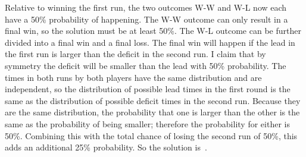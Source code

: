 \documentclass{article}
\begin{document}
Relative to winning the first run, the two outcomes W-W and W-L now each have a 50\% probability of happening.
The W-W outcome can only result in a final win, so the solution must be at least 50\%.
The W-L outcome can be further divided into a final win and a final loss.
The final win will happen if the lead in the first run is larger than the deficit in the second run.
I claim that by symmetry the deficit will be smaller than the lead with 50\% probability.
The times in both runs by both players have the same distribution and are independent, so the distribution of possible lead times in the first round is the same as the distribution of possible deficit times in the second run.
Because they are the same distribution, the probability that one is larger than the other is the same as the probability of being smaller; therefore the probability for either is 50\%.
Combining this with the total chance of losing the second run of 50\%, this adds an additional 25\% probability.
So the solution is
\,.

\begin{comment}
For the extra credit, I believe that the answer should be
\fcolorbox{red}{white}{$\bm{{\nicefrac{31}{60}=51.66\dots\%}}$}\,, but I'm not too sure how to rigorously prove it.
\end{comment}
\end{document}
